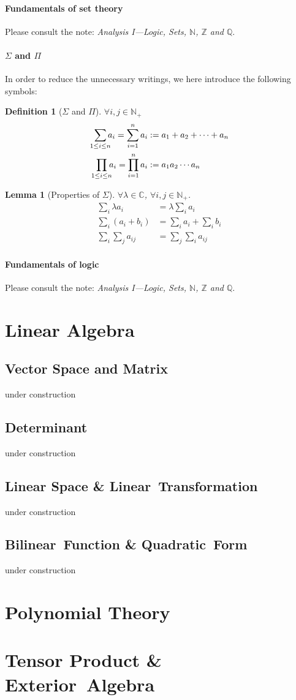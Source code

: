 \documentclass[a4paper]{book}
\newtheorem{definition}{Definition}[section]
\newtheorem{lemma}{Lemma}[section]
\begin{document}
				\subsection{Fundamentals of set theory}
					Please consult the note: \textit{Analysis I---Logic, Sets, $\mathbb{N}$, $\mathbb{Z}$ and $\mathbb{Q}$}.
				\subsection{$\Sigma$ and $\Pi$}
					In order to reduce the unnecessary writings, we here introduce the following symbols:
					\begin{definition}[$\Sigma$ and $\Pi$]
						$\forall i,j\in\mathbb{N}_+$
						\begin{align*}
							\sum_{1\leq i\leq n}\mspace{-9mu}a_i=\sum_{i=1}^{n}a_i&:=a_1+a_2+\dotsb +a_n\\
							\prod_{1\leq i\leq n}\mspace{-9mu}a_i=\prod_{i=1}^{n}a_i&:=a_1a_2\dotsm a_n
						\end{align*}
					\end{definition}
				\begin{lemma}[Properties of $\Sigma$]
					$\forall \lambda\in\mathbb{C}$, $\forall i,j\in\mathbb{N}_+$.
					\begin{align*}
						\sum_{i}\lambda a_i&=\lambda\sum_{i}a_i\\
						\sum_{i}(a_i+b_i)&=\sum_{i}a_i+\sum_{i}b_i\\
						\sum_{i}\sum_{j}a_{ij}&=\sum_{j}\sum_{i}a_{ij}
					\end{align*}
				\end{lemma}
				\subsection{Fundamentals of logic}
					Please consult the note: \textit{Analysis I---Logic, Sets, $\mathbb{N}$, $\mathbb{Z}$ and $\mathbb{Q}$}.
\part{Linear Algebra}
	\chapter{Vector Space and Matrix}
	under construction
	\chapter{Determinant}
	under construction
	\chapter{Linear Space \& Linear~Transformation}
	under construction
	\chapter{Bilinear~Function \& Quadratic~Form}
	under construction
\part{Polynomial Theory}

\part{Tensor Product \& Exterior~Algebra}
\end{document}
